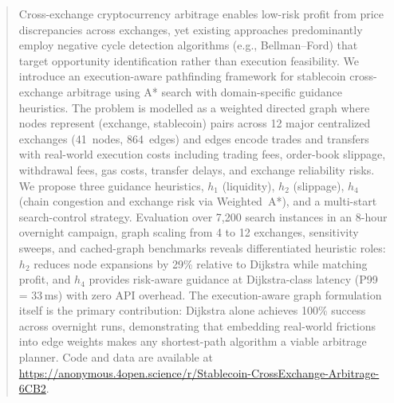 \begin{abstract}
Cross-exchange cryptocurrency arbitrage enables low-risk profit from price discrepancies across exchanges, yet existing approaches predominantly employ negative cycle detection algorithms (e.g., Bellman--Ford) that target opportunity identification rather than execution feasibility. We introduce an execution-aware pathfinding framework for stablecoin cross-exchange arbitrage using A* search with domain-specific guidance heuristics. The problem is modelled as a weighted directed graph where nodes represent (exchange, stablecoin) pairs across 12 major centralized exchanges (41~nodes, 864~edges) and edges encode trades and transfers with real-world execution costs including trading fees, order-book slippage, withdrawal fees, gas costs, transfer delays, and exchange reliability risks. We propose three guidance heuristics, $h_1$ (liquidity), $h_2$ (slippage), $h_4$ (chain congestion and exchange risk via Weighted~A*), and a multi-start search-control strategy. Evaluation over 7{,}200 search instances in an 8-hour overnight campaign, graph scaling from 4 to 12 exchanges, sensitivity sweeps, and cached-graph benchmarks reveals differentiated heuristic roles: $h_2$ reduces node expansions by 29\% relative to Dijkstra while matching profit, and $h_4$ provides risk-aware guidance at Dijkstra-class latency (P99 = 33\,ms) with zero API overhead. The execution-aware graph formulation itself is the primary contribution: Dijkstra alone achieves 100\% success across overnight runs, demonstrating that embedding real-world frictions into edge weights makes any shortest-path algorithm a viable arbitrage planner. Code and data are available at \url{https://anonymous.4open.science/r/Stablecoin-CrossExchange-Arbitrage-6CB2}.
\end{abstract}
